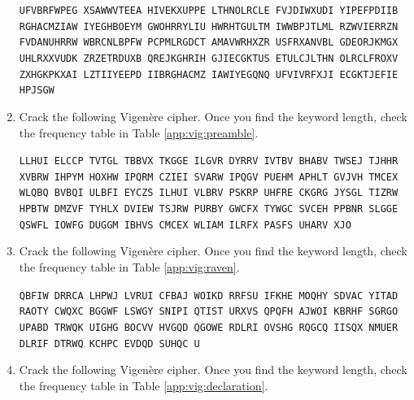 \documentclass{book}
\theoremstyle{plain}
\theoremstyle{definition}
\newif\ifprintsolutions
\newcommand{\solution}[1]{\ifprintsolutions \begin{sloppypar}{\it #1}\end{sloppypar} \fi} %
\newcommand{\display}[1]{\begin{sloppypar}\setlength{\parindent}{0mm}#1\end{sloppypar}} %
\newcommand{\ciphertextspace}[1]{\begin{sloppypar}\doublespacing\Large\texttt{#1}\end{sloppypar}} %
\begin{document}
\begin{enumerate}
\display{\ciphertextspace{UFVBRFWPEG XSAWWVTEEA HIVEKXUPPE LTHNOLRCLE FVJDIWXUDI YIPEFPDIIB RGHACMZIAW IYEGHBOEYM GWOHRRYLIU HWRHTGULTM IWWBPJTLML RZWVIERRZN FVDANUHRRW WBRCNLBPFW PCPMLRGDCT AMAVWRHXZR USFRXANVBL GDEORJKMGX UHLRXXVUDK ZRZETRDUXB QREJKGHRIH GJIECGKTUS ETULCJLTHN OLRCLFROXV ZXHGKPKXAI LZTIIYEEPD IIBRGHACMZ IAWIYEGQNQ UFVIVRFXJI ECGKTJEFIE HPJSGW}} \solution{Multigraphs ECGKT (77), IECGK (77), WRH (63), HNOL (196), NOLR (196), keyword PRETEND: For instance, on the planet Earth, man had always assumed that he was more intelligent than dolphins because he had achieved so much—the wheel, New York, wars and so on—whilst all the dolphins had ever done was muck about in the water having a good time. But conversely, the dolphins had always believed that they were far more intelligent than man—for precisely the same reasons.}
\item\label{exer:vig:preamble} Crack the following Vigen\`{e}re cipher. Once you find the keyword length, check the frequency table in Table \ref{app:vig:preamble}.
\display{\ciphertextspace{LLHUI ELCCP TVTGL TBBVX TKGGE ILGVR DYRRV IVTBV BHABV TWSEJ TJHHR XVBRW IHPYM HOXHW IPQRM CZIEI SVARW IPQGV PUEHM APHLT GVJVH TMCEX WLQBQ BVBQI ULBFI EYCZS ILHUI VLBRV PSKRP UHFRE CKGRG JYSGL TIZRW HPBTW DMZVF TYHLX DVIEW TSJRW PURBY GWCFX TYWGC SVCEH PPBNR SLGGE QSWFL IOWFG DUGGM IBHVS CMCEX WLIAM ILRFX PASFS UHARV XJO}} \solution{Keyword PHONE, multigraphs MCEXWL, WIPQ, LHUI: We, the people of the United States, in order to form a more perfect union, establish justice, insure domestic tranquility, provide for the common defense, promote the general welfare, and secure the blessings of liberty to ourselves and our posterity, do ordain and establish this Constitution for the United States of America.}
\item\label{exer:vig:raven} Crack the following Vigen\`{e}re cipher. Once you find the keyword length, check the frequency table in Table \ref{app:vig:raven}.
\display{\ciphertextspace{QBFIW DRRCA LHPWJ LVRUI CFBAJ WOIKD RRFSU IFKHE MOQHY SDVAC YITAD RAOTY CWQXC BGGWF LSWGY SNIPI QTIST URXVS QPQFH AJWOI KBRHF SGRGO UPABD TRWQK UIGHG BOCVV HVGQD QGOWE RDLRI OVSHG RQGCQ IISQX NMUER DLRIF DTRWQ KCHPC EVDQD SUHQC U}} \solution{Keyword CODE, trigraphs DRR, AJW, DTR, ERD: Once upon a midnight dreary, while I pondered weak and weary, over many a quaint and curious volume of forgotten lore, while I nodded, nearly napping, suddenly there came a tapping, as of someone gently rapping, rapping at my chamber door.}
\item\label{exer:vig:declaration} Crack the following Vigen\`{e}re cipher. Once you find the keyword length, check the frequency table in Table \ref{app:vig:declaration}.

\end{enumerate}
\end{document}
